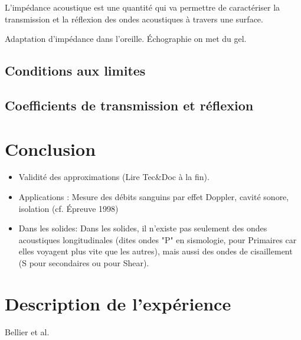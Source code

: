 \documentclass[11pt]{report}
\numberwithin{figure}{section}
\numberwithin{equation}{section}
\numberwithin{table}{section}
\newcommand{\1}{\boldsymbol{1}}
\begin{document}
L'impédance acoustique est une quantité qui va permettre de caractériser la transmission et la réflexion des ondes acoustiques à travers une surface.

Adaptation d'impédance dans l'oreille. Échographie on met du gel.

\subsection{Conditions aux limites}

\subsection{Coefficients de transmission et réflexion}


\section*{Conclusion}

\begin{itemize}
\item Validité des approximations (Lire Tec\&Doc à la fin).
\item Applications : Mesure des débits sanguins par effet Doppler, cavité sonore, isolation (cf. Épreuve 1998)
\item Dans les solides: Dans les solides, il n'existe pas seulement des ondes acoustiques longitudinales (dites ondes "P" en sismologie, pour Primaires car elles voyagent plus vite que les autres), mais aussi des ondes de cisaillement (S pour secondaires ou pour Shear).
\end{itemize}



\section*{Description de l'expérience}

\textcolor{mycolor5}{Bellier et al.}
\end{document}
